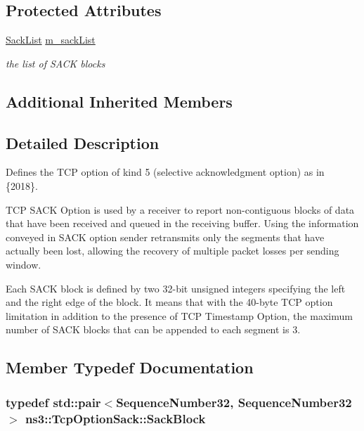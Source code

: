 \subsection*{Protected Attributes}
\begin{DoxyCompactItemize}
\item 
\hyperlink{classns3_1_1TcpOptionSack_a2aa2d721c71424680d79ebaa079f264a}{Sack\+List} \hyperlink{classns3_1_1TcpOptionSack_ae3ea6e0f8848656fa8ab68ca6316dc03}{m\+\_\+sack\+List}
\begin{DoxyCompactList}\small\item\em the list of S\+A\+CK blocks \end{DoxyCompactList}\end{DoxyCompactItemize}
\subsection*{Additional Inherited Members}


\subsection{Detailed Description}
Defines the T\+CP option of kind 5 (selective acknowledgment option) as in \{2018\}. 

T\+CP S\+A\+CK Option is used by a receiver to report non-\/contiguous blocks of data that have been received and queued in the receiving buffer. Using the information conveyed in S\+A\+CK option sender retransmits only the segments that have actually been lost, allowing the recovery of multiple packet losses per sending window.

Each S\+A\+CK block is defined by two 32-\/bit unsigned integers specifying the left and the right edge of the block. It means that with the 40-\/byte T\+CP option limitation in addition to the presence of T\+CP Timestamp Option, the maximum number of S\+A\+CK blocks that can be appended to each segment is 3. 

\subsection{Member Typedef Documentation}
\subsubsection[{\texorpdfstring{Sack\+Block}{SackBlock}}]{\setlength{\rightskip}{0pt plus 5cm}typedef std\+::pair$<${\bf Sequence\+Number32}, {\bf Sequence\+Number32}$>$ {\bf ns3\+::\+Tcp\+Option\+Sack\+::\+Sack\+Block}}\hypertarget{classns3_1_1TcpOptionSack_a9e1d07d8729fd3ac5ead7305794675c3}{}\label{classns3_1_1TcpOptionSack_a9e1d07d8729fd3ac5ead7305794675c3}


